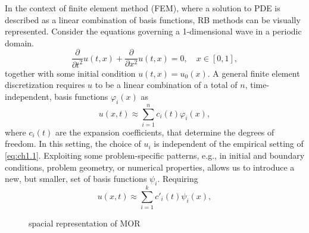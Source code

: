 In the context of finite element method (FEM), where a solution to PDE is described as a linear combination of basis functions, RB methods can be visually represented. Consider the equations governing a 1-dimensional wave in a periodic domain.
\begin{equation} \label{eq:ch1.1}
	\frac{\partial }{\partial t^2} u(t,x) + \frac{\partial }{\partial x^2} u(t,x) = 0, \quad x\in[0,1],
\end{equation}
together with some initial condition $u(t,x) = u_0(x)$. A general finite element discretization requires $u$ to be a linear combination of a total of $n$, time-independent, basis functions $\varphi_i(x)$ as
\begin{equation} \label{eq:ch1.2}
	u(x,t) \approx \sum_{i=1}^n c_i(t) \varphi_i(x),
\end{equation}
where $c_i(t)$ are the expansion coefficients, that determine the degrees of freedom. In this setting, the choice of $u_i$ is independent of the empirical setting of \eqref{eq:ch1.1}. Exploiting some problem-specific patterns, e.g., in initial and boundary conditions, problem geometry, or numerical properties, allows us to introduce a new, but smaller, set of basis functions $\psi_i$. Requiring
\begin{equation} \label{eq:ch1.3}
	u(x,t) \approx \sum_{i=1}^k c'_i(t) \psi_i(x),
\end{equation}
\begin{figure} [t]
	\caption{spacial representation of MOR}
	\label{fig:ch1.1}
\end{figure}
